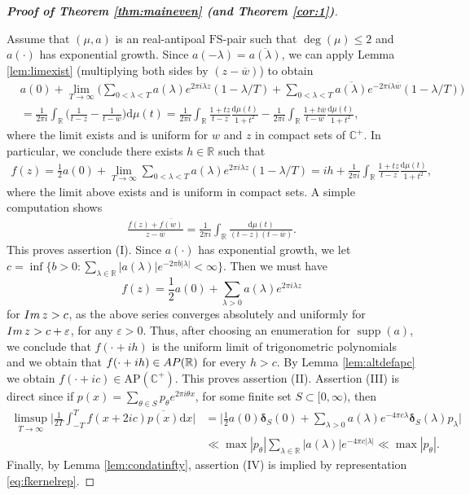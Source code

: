\documentclass[a4paper,reqno,12pt]{amsart}
\DeclareMathOperator{\supp}{\mathrm{supp}}
\renewcommand{\H}{\mathbb{C}^+}
\renewcommand{\r}{\mathbb{R}}
\newcommand{\bo}{\boldsymbol}
\newcommand{\la}{\lambda}
\newcommand{\ep}{\varepsilon}
\renewcommand{\d}{\mathrm{d}}
\newcommand{\w}{\ov{w}}
\newcommand{\1}{{\bf 1}}
\newcommand{\apc}{\mathrm{AP}(\H)}
\newcommand{\fs}{\mathrm{FS}}
\newcommand{\ov}[1]{\overline{#1}}
\newcommand{\apr}{{\rm AP}(\r)}
\renewcommand{\1}{{\bo 1}}
\newcommand{\del}{{\bo \delta}}
\renewcommand{\Im}{{\rm Im}\,}
\renewcommand{\a}{a(\cdot)}
\begin{document}
\vspace{-1cm}

\begin{proof}[\bf Proof of Theorem \ref{thm:maineven} (and Theorem \ref{cor:1})]
$\nonumber$

Assume that $(\mu,a)$ is an real-antipoal $\fs$-pair such that $\deg(\mu)\leq 2$ and $\a$ has exponential growth. Since $a(-\la)=\ov{a(\la)}$, we can apply Lemma \ref{lem:limexist} (multiplying both sides by $(z-\w)$) to obtain
\begin{align*}
& a(0) + \lim_{T\to\infty} \bigg(\sum_{0<\la<T} a(\la)e^{2\pi i  \la z}(1-\la/T)  + \sum_{0<\la<T} \ov{a(\la)}e^{-2\pi i \la \w}(1-\la/T) \bigg) \\ & = \frac{1}{2\pi i}\int_\r  \bigg(\frac{1}{t-z}-\frac{1}{t-\w}\bigg){\d \mu(t)} = \frac{1}{2\pi i}\int_\r  \frac{1+tz}{t-z}\frac{\d\mu(t)}{1+t^2} - \frac{1}{2\pi i}\int_\r  \frac{1+t\w}{t-\w}\frac{\d\mu(t)}{1+t^2},
\end{align*}
where the limit exists and is uniform for $w$ and $z$ in compact sets of $\H$. In particular, we conclude there exists $h\in\r$ such that
\begin{align}\label{eq:fPoissonrep}
f(z) = \frac12 a(0) + \lim_{T\to\infty} \sum_{0<\la<T} a(\la)e^{2\pi i  \la z}(1-\la/T) = ih+ \frac{1}{2\pi i}\int_\r  \frac{1+tz}{t-z}\frac{\d\mu(t)}{1+t^2},
\end{align}
where the limit above exists and is uniform in compact sets. A simple computation shows
\begin{align}\label{eq:fkernelrep}
\frac{f(z)+\ov{f(w)}}{z-\ov w} =  \frac{1}{2\pi i}\int_\r  \frac{\d \mu(t)}{(t-z)(t-\w)}.
\end{align}
This proves assertion (I).  Since $\a$ has exponential growth, we let $c=\inf \{b>0 : \sum_{\la\in \r} |a(\la)|e^{-2\pi b |\la|} < \infty\}$. Then we must have
$$
f(z) = \frac12 a(0) +\sum_{\la>0} a(\la)e^{2\pi i  \la z}
$$
for $\Im z>c$, as the above series converges absolutely and uniformly for $\Im z > c + \ep$, for any $\ep>0$. Thus, after choosing an enumeration for $\supp(a)$, we conclude that $f(\cdot +ih)$ is the uniform limit of trigonometric polynomials and we obtain that $f(\cdot +ih) \in \apr$ for every $h>c$.  By Lemma \ref{lem:altdefapc} we obtain $f(\cdot+ic)\in \apc$. This proves assertion (II). Assertion (III) is direct since if $p(x)=\sum_{\theta \in S} p_\theta e^{2\pi i \theta x}$, for some finite set $S\subset [0,\infty)$, then
\begin{align*}
\limsup_{T\to\infty}\bigg| \frac{1}{2T}\int_{-T}^T f(x+2ic)\ov{p(x)}\d x\bigg| & = \bigg| \frac12a(0)\del_S(0) + \sum_{\la>0} a(\la)e^{-4\pi c\la} \del_S(\la) p_\la \bigg| \\
& \ll \max |p_\theta| \sum_{\la\in \r} |a(\la)|e^{-4\pi c |\la|} \ll \max |p_\theta|.
\end{align*}
Finally, by Lemma \ref{lem:condatinfty}, assertion (IV) is implied by representation \eqref{eq:fkernelrep}.


\end{proof}
\end{document}
